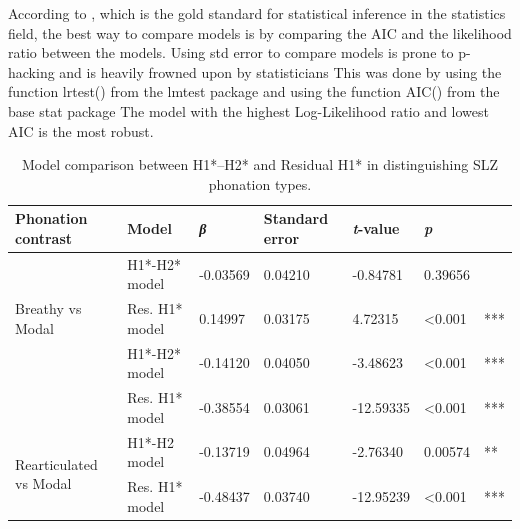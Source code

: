 \documentclass[12pt, letterpaper]{article}
\providecommand{\lsptoprule}{\midrule\toprule}
\providecommand{\lspbottomrule}{\bottomrule\midrule}
\begin{document}
According to \citet{casellaStatisticalInference2002}, which is the gold standard for statistical inference in the statistics field, the best way to compare models is by comparing the AIC and the likelihood ratio between the models.
Using std error to compare models is prone to p-hacking and is heavily frowned upon by statisticians 
This was done by using the function lrtest() from the lmtest package and using the function AIC() from the base stat package
The model with the highest Log-Likelihood ratio and lowest AIC is the most robust. 

\begin{table}[!h]
  \centering
  \caption{Model comparison between H1*–H2* and Residual H1* in distinguishing SLZ phonation types.}
  \label{tab:CGComparison}
  \begin{tabular}{lllllll}
    \lsptoprule
    Phonation contrast                      & Model       & \textit{β} & Standard error & \textit{t}-value & \textit{p}      &     \\
    \hline
    \multirow[t]{3}{*}{Breathy vs Modal}       & Η1*-Η2* model & -0.03569    & 0.04210         & -0.84781  & 0.39656          &     \\
    & Res. H1* model & 0.14997  & 0.03175 & 4.72315   & \textless 0.001   & *** \\
    \multirow[t]{3}{*}{Checked vs Modal}       & Η1*-Η2* model & -0.14120    & 0.04050         & -3.48623  & \textless 0.001 & *** \\
    & Res. H1* model & -0.38554 & 0.03061 & -12.59335 & \textless 0.001 & *** \\
    \multirow[t]{3}{*}{Rearticulated vs Modal} & Η1*-Η2 model & -0.13719   & 0.04964         & -2.76340 & 0.00574           & **  \\
    & Res. H1* model & -0.48437 & 0.03740 & -12.95239 & \textless 0.001 & *** \\
    \lspbottomrule
  \end{tabular}
\end{table}
\end{document}
